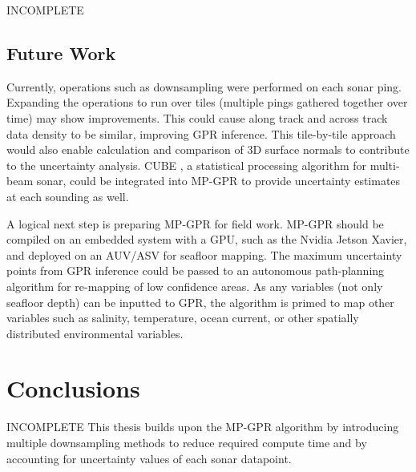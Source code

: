INCOMPLETE


\subsection{Future Work}

Currently, operations such as downsampling were performed on each sonar ping. Expanding the operations to run over tiles (multiple pings gathered together over time) may show improvements. This could cause along track and across track data density to be similar, improving GPR inference. This tile-by-tile approach would also enable calculation and comparison of 3D surface normals to contribute to the uncertainty analysis. CUBE \cite{calder2003automatic}, a statistical processing algorithm for multi-beam sonar, could be integrated into MP-GPR to provide uncertainty estimates at each sounding as well. 

A logical next step is preparing MP-GPR for field work. MP-GPR should be compiled on an embedded system with a GPU, such as the Nvidia Jetson Xavier, and deployed on an AUV/ASV for seafloor mapping. The maximum uncertainty points from GPR inference could be passed to an autonomous path-planning algorithm for re-mapping of low confidence areas. As any variables (not only seafloor depth) can be inputted to GPR, the algorithm is primed to map other variables such as salinity, temperature, ocean current, or other spatially distributed environmental variables.  

\section{Conclusions}\label{sec:conclusion}

INCOMPLETE
This thesis builds upon the MP-GPR algorithm by introducing multiple downsampling methods to reduce required compute time and by accounting for uncertainty values of each sonar datapoint.\cite{Rasmussen2006}



